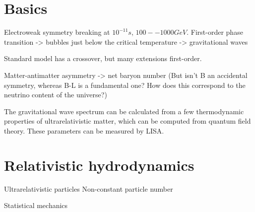 \section{Basics}
Electroweak symmetry breaking at $10^{-11} s$, $100 -- 1000 GeV$.
First-order phase transition
-> bubbles just below the critical temperature
-> gravitational waves

Standard model has a crossover, but many extensions first-order.

Matter-antimatter asymmetry -> net baryon number
(But isn't B an accidental symmetry, whereas B-L is a fundamental one?
How does this correspond to the neutrino content of the universe?)
\cite{lecture_notes}

The gravitational wave spectrum can be calculated from a few thermodynamic properties of ultrarelativistic matter, which can be computed from quantum field theory.
These parameters can be measured by LISA.

\section{Relativistic hydrodynamics}
Ultrarelativistic particles
Non-constant particle number

Statistical mechanics \cite{huang_statistical_1987}
\cite{schroeder_thermal_2000}
\cite[ch. 4]{lecture_notes}

